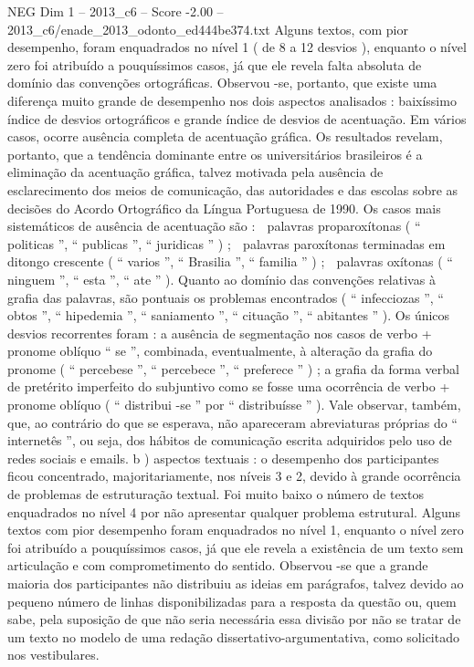 \begin{textsample}{NEG Dim 1 – 2013\_c6 – Score -2.00 – 2013\_c6/enade\_2013\_odonto\_ed444be374.txt}
Alguns textos, com pior desempenho, foram enquadrados no nível 1 ( de 8 a 12 desvios ), enquanto o nível zero foi atribuído a pouquíssimos casos, já que ele revela falta absoluta de domínio das convenções ortográficas.
Observou -se, portanto, que existe uma diferença muito grande de desempenho nos dois aspectos analisados : baixíssimo índice de desvios ortográficos e grande índice de desvios de acentuação.
Em vários casos, ocorre ausência completa de acentuação gráfica.
Os resultados revelam, portanto, que a tendência dominante entre os universitários brasileiros é a eliminação da acentuação gráfica, talvez motivada pela ausência de esclarecimento dos meios de comunicação, das autoridades e das escolas sobre as decisões do Acordo Ortográfico da Língua Portuguesa de 1990.
Os casos mais sistemáticos de ausência de acentuação são :  palavras proparoxítonas ( “ politicas ”, “ publicas ”, “ juridicas ” ) ;  palavras paroxítonas terminadas em ditongo crescente ( “ varios ”, “ Brasilia ”, “ familia ” ) ;  palavras oxítonas ( “ ninguem ”, “ esta ”, “ ate ” ).
Quanto ao domínio das convenções relativas à grafia das palavras, são pontuais os problemas encontrados ( “ infecciozas ”, “ obtos ”, “ hipedemia ”, “ saniamento ”, “ cituação ”, “ abitantes ” ).
Os únicos desvios recorrentes foram : a ausência de segmentação nos casos de verbo + pronome oblíquo “ se ”, combinada, eventualmente, à alteração da grafia do pronome ( “ percebese ”, “ percebece ”, “ preferece ” ) ; a grafia da forma verbal de pretérito imperfeito do subjuntivo como se fosse uma ocorrência de verbo + pronome oblíquo ( “ distribui -se ” por “ distribuísse ” ).
Vale observar, também, que, ao contrário do que se esperava, não apareceram abreviaturas próprias do “ internetês ”, ou seja, dos hábitos de comunicação escrita adquiridos pelo uso de redes sociais e emails. b ) aspectos textuais : o desempenho dos participantes ficou concentrado, majoritariamente, nos níveis 3 e 2, devido à grande ocorrência de problemas de estruturação textual.
Foi muito baixo o número de textos enquadrados no nível 4 por não apresentar qualquer problema estrutural.
Alguns textos com pior desempenho foram enquadrados no nível 1, enquanto o nível zero foi atribuído a pouquíssimos casos, já que ele revela a existência de um texto sem articulação e com comprometimento do sentido.
Observou -se que a grande maioria dos participantes não distribuiu as ideias em parágrafos, talvez devido ao pequeno número de linhas disponibilizadas para a resposta da questão ou, quem sabe, pela suposição de que não seria necessária essa divisão por não se tratar de um texto no modelo de uma redação dissertativo-argumentativa, como solicitado nos vestibulares.

\end{textsample}
